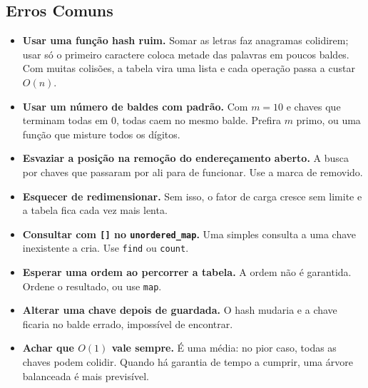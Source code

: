 \subsection{Erros Comuns}

\begin{itemize}
  \item \textbf{Usar uma função hash ruim.} Somar as letras faz anagramas colidirem; usar só o primeiro caractere coloca metade das palavras em poucos baldes. Com muitas colisões, a tabela vira uma lista e cada operação passa a custar $O(n)$.
  \item \textbf{Usar um número de baldes com padrão.} Com $m = 10$ e chaves que terminam todas em 0, todas caem no mesmo balde. Prefira $m$ primo, ou uma função que misture todos os dígitos.
  \item \textbf{Esvaziar a posição na remoção do endereçamento aberto.} A busca por chaves que passaram por ali para de funcionar. Use a marca de removido.
  \item \textbf{Esquecer de redimensionar.} Sem isso, o fator de carga cresce sem limite e a tabela fica cada vez mais lenta.
  \item \textbf{Consultar com \texttt{[]} no \texttt{unordered\_map}.} Uma simples consulta a uma chave inexistente a cria. Use \texttt{find} ou \texttt{count}.
  \item \textbf{Esperar uma ordem ao percorrer a tabela.} A ordem não é garantida. Ordene o resultado, ou use \texttt{map}.
  \item \textbf{Alterar uma chave depois de guardada.} O hash mudaria e a chave ficaria no balde errado, impossível de encontrar.
  \item \textbf{Achar que $O(1)$ vale sempre.} É uma média: no pior caso, todas as chaves podem colidir. Quando há garantia de tempo a cumprir, uma árvore balanceada é mais previsível.
\end{itemize}

